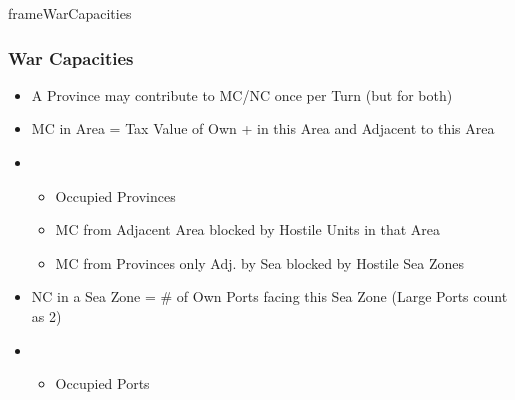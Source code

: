 \documentclass[10pt]{article}
\begin{document}
\begin{dynamiccontents*}{frameWarCapacities}
	\subsubsection*{War Capacities }
	\begin{itemize}
		\item A Province may contribute to MC/NC once per Turn (but for both)
	\end{itemize}	
	\begin{itemize}
		\item MC in Area = Tax Value of Own \towns + \vassals in this Area and Adjacent to this Area
		\item {}
		\begin{itemize}
			\item Occupied Provinces
			\item MC from Adjacent Area blocked by Hostile Units in that Area
			\item MC from Provinces only Adj. by Sea blocked by Hostile Sea Zones
		\end{itemize}
	\end{itemize}
	\begin{itemize}
		\item NC in a Sea Zone = \# of Own Ports facing this Sea Zone (Large Ports count as 2)
		\item {}
		\begin{itemize}
			\item Occupied Ports
		\end{itemize}
	\end{itemize}
\end{dynamiccontents*}
\end{document}
